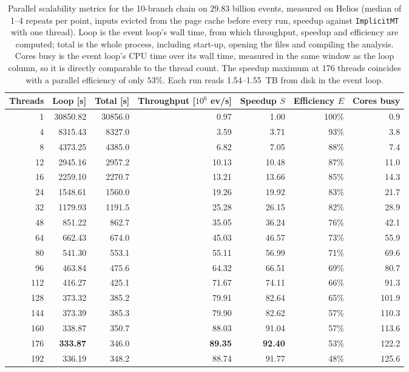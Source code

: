 \begin{table}[htbp]
\centering
\caption{Parallel scalability metrics for the 10-branch chain on $29.83$ billion events, measured on Helios (median of 1--4 repeats per point, inputs evicted from the page cache before every run, speedup against \texttt{ImplicitMT} with one thread). Loop is the event loop's wall time, from which throughput, speedup and efficiency are computed; total is the whole process, including start-up, opening the files and compiling the analysis. Cores busy is the event loop's CPU time over its wall time, measured in the same window as the loop column, so it is directly comparable to the thread count. The speedup maximum at 176 threads coincides with a parallel efficiency of only $53\%$. Each run reads 1.54--1.55~TB from disk in the event loop.}
\label{tab:scalability-chain11}
\setlength{\tabcolsep}{5pt}
\begin{tabular}{rrrrrrr}
\toprule
Threads & Loop [s] & Total [s] & Throughput [$10^6$ ev/s] & Speedup $S$ & Efficiency $E$ & Cores busy \\
\midrule
 1 & 30850.82 & 30856.0 & 0.97 & 1.00 & 100\% & 0.9 \\
 4 & 8315.43 & 8327.0 & 3.59 & 3.71 & 93\% & 3.8 \\
 8 & 4373.25 & 4385.0 & 6.82 & 7.05 & 88\% & 7.4 \\
12 & 2945.16 & 2957.2 & 10.13 & 10.48 & 87\% & 11.0 \\
16 & 2259.10 & 2270.7 & 13.21 & 13.66 & 85\% & 14.3 \\
24 & 1548.61 & 1560.0 & 19.26 & 19.92 & 83\% & 21.7 \\
32 & 1179.93 & 1191.5 & 25.28 & 26.15 & 82\% & 28.9 \\
48 & 851.22 & 862.7 & 35.05 & 36.24 & 76\% & 42.1 \\
64 & 662.43 & 674.0 & 45.03 & 46.57 & 73\% & 55.9 \\
80 & 541.30 & 553.1 & 55.11 & 56.99 & 71\% & 69.6 \\
96 & 463.84 & 475.6 & 64.32 & 66.51 & 69\% & 80.7 \\
112 & 416.27 & 425.1 & 71.67 & 74.11 & 66\% & 91.3 \\
128 & 373.32 & 385.2 & 79.91 & 82.64 & 65\% & 101.9 \\
144 & 373.39 & 385.3 & 79.90 & 82.62 & 57\% & 110.3 \\
160 & 338.87 & 350.7 & 88.03 & 91.04 & 57\% & 113.6 \\
176 & \textbf{333.87} & 346.0 & \textbf{89.35} & \textbf{92.40} & 53\% & 122.2 \\
192 & 336.19 & 348.2 & 88.74 & 91.77 & 48\% & 125.6 \\
\bottomrule
\end{tabular}
\end{table}
